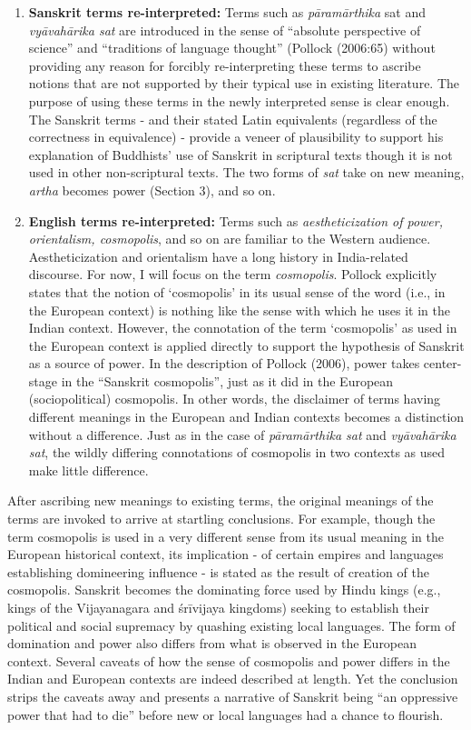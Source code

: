\begin{enumerate}
\item {\bf Sanskrit terms re-interpreted:} Terms such as {\sl pāramārthika} sat and {\sl vyāvahārika sat} are introduced in the sense of “absolute perspective of science” and “traditions of language thought” (Pollock (2006:65) without providing any reason for forcibly re-interpreting these terms to ascribe notions that are not supported by their typical use in existing literature. The purpose of using these terms in the newly interpreted sense is clear enough. The Sanskrit terms - and their stated Latin equivalents (regardless of the correctness in equivalence) - provide a veneer of plausibility to support his explanation of Buddhists’ use of Sanskrit in scriptural texts though it is not used in other non-scriptural texts. The two forms of {\sl sat} take on new meaning, {\sl artha} becomes power (Section 3), and so on.

\item {\bf English terms re-interpreted:} Terms such as {\sl aestheticization of power, orientalism, cosmopolis}, and so on are familiar to the Western audience. Aestheticization and orientalism have a long history in India-related discourse. For now, I will focus on the term {\sl cosmopolis}. Pollock explicitly states that the notion of ‘cosmopolis’ in its usual sense of the word (i.e., in the European context) is nothing like the sense with which he uses it in the Indian context. However, the connotation of the term ‘cosmopolis’ as used in the European context is applied directly to support the hypothesis of Sanskrit as a source of power. In the description of Pollock (2006), power takes center-stage in the “Sanskrit cosmopolis”, just as it did in the European (sociopolitical) cosmopolis. In other words, the disclaimer of terms having different meanings in the European and Indian contexts becomes a distinction without a difference. Just as in the case of {\sl pāramārthika sat} and {\sl vyāvahārika sat}, the wildly differing connotations of cosmopolis in two contexts as used make little difference.
\end{enumerate}

After ascribing new meanings to existing terms, the original meanings of the terms are invoked to arrive at startling conclusions. For example, though the term cosmopolis is used in a very different sense from its usual meaning in the European historical context, its implication - of certain empires and languages establishing domineering influence - is stated as the result of creation of the cosmopolis. Sanskrit becomes the dominating force used by Hindu kings (e.g., kings of the Vijayanagara and śrīvijaya kingdoms) seeking to establish their political and social supremacy by quashing existing local languages. The form of domination and power also differs from what is observed in the European context. Several caveats of how the sense of cosmopolis and power differs in the Indian and European contexts are indeed described at length. Yet the conclusion strips the caveats away and presents a narrative of Sanskrit being “an oppressive power that had to die” before new or local languages had a chance to flourish.

